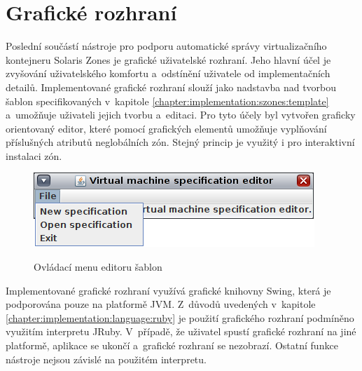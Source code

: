 \section{Grafické rozhraní}
\label{chapter:implementation:gui}
Poslední součástí nástroje pro podporu automatické správy virtualizačního kontejneru Solaris Zones je grafické uživatelské 
rozhraní. Jeho hlavní účel je zvyšování uživatelského komfortu a~odstínění uživatele od implementačních detailů. 
Implementované grafické rozhraní slouží jako nadstavba nad tvorbou šablon specifikovaných v~kapitole \ref{chapter:implementation:szones:template}
a~umožňuje uživateli jejich tvorbu a~editaci. Pro tyto účely byl vytvořen graficky orientovaný editor, které pomocí grafických
elementů umožňuje vyplňování příslušných atributů neglobálních zón. Stejný princip je využitý i pro interaktivní instalaci 
zón.
\begin{figure}[b]
    \centering    
    \caption{Ovládací menu editoru šablon}
    \includegraphics[scale=0.9]{assets/png/implemetation_gui_menu.png}
    \label{image:implemetation:gui:menu}
\end{figure}
Implementované grafické rozhraní využívá grafické knihovny Swing, která je podporována pouze na platformě JVM. Z~důvodů uvedených
v~kapitole \ref{chapter:implementation:language:ruby} je použití grafického rozhraní podmíněno využitím interpretu JRuby.
V~případě, že uživatel spustí grafické rozhraní na jiné platformě, aplikace se ukončí a~grafické rozhraní se nezobrazí. Ostatní
funkce nástroje nejsou závislé na použitém interpretu.
